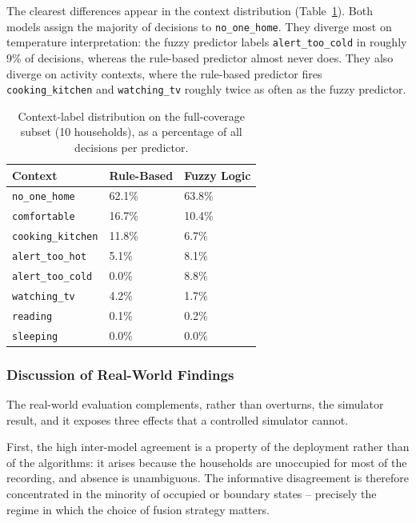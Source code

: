 The clearest differences appear in the context distribution
(Table~\ref{tab:hslu-distribution}). Both models assign the majority of decisions
to \texttt{no\_one\_home}. They diverge most on temperature interpretation: the
fuzzy predictor labels \texttt{alert\_too\_cold} in roughly 9\% of decisions,
whereas the rule-based predictor almost never does. They also diverge on activity
contexts, where the rule-based predictor fires \texttt{cooking\_kitchen} and
\texttt{watching\_tv} roughly twice as often as the fuzzy predictor.

\begin{table}[htbp]
\captionsetup{justification=centering}
\caption{Context-label distribution on the full-coverage subset (10 households),
as a percentage of all decisions per predictor.}
\label{tab:hslu-distribution}
\centering
\small
\renewcommand{\arraystretch}{1.2}
\begin{tabular}{@{}p{} p{} p{}@{}}
\hline
\textbf{Context} & \textbf{Rule-Based} & \textbf{Fuzzy Logic} \\
\hline
\texttt{no\_one\_home}    & 62.1\% & 63.8\% \\
\texttt{comfortable}      & 16.7\% & 10.4\% \\
\texttt{cooking\_kitchen} & 11.8\% & \phantom{0}6.7\% \\
\texttt{alert\_too\_hot}  & \phantom{0}5.1\% & \phantom{0}8.1\% \\
\texttt{alert\_too\_cold} & \phantom{0}0.0\% & \phantom{0}8.8\% \\
\texttt{watching\_tv}     & \phantom{0}4.2\% & \phantom{0}1.7\% \\
\texttt{reading}          & \phantom{0}0.1\% & \phantom{0}0.2\% \\
\texttt{sleeping}         & \phantom{0}0.0\% & \phantom{0}0.0\% \\
\hline
\end{tabular}
\end{table}

\subsubsection{Discussion of Real-World Findings}

The real-world evaluation complements, rather than overturns, the simulator
result, and it exposes three effects that a controlled simulator cannot.

First, the high inter-model agreement is a property of the deployment rather than
of the algorithms: it arises because the households are unoccupied for most of the
recording, and absence is unambiguous. The informative disagreement is therefore
concentrated in the minority of occupied or boundary states -- precisely the
regime in which the choice of fusion strategy matters.

